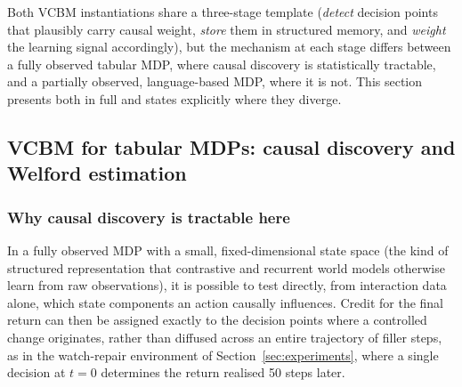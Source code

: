 \documentclass[conference]{IEEEtran}
\begin{document}
Both VCBM instantiations share a three-stage template (\emph{detect} decision points that plausibly carry causal weight, \emph{store} them in structured memory, and \emph{weight} the learning signal accordingly), but the mechanism at each stage differs between a fully observed tabular MDP, where causal discovery is statistically tractable, and a partially observed, language-based MDP, where it is not. This section presents both in full and states explicitly where they diverge.

\subsection{VCBM for tabular MDPs: causal discovery and Welford estimation}
\label{sec:vcbm-tabular}

\subsubsection{Why causal discovery is tractable here}
In a fully observed MDP with a small, fixed-dimensional state space (the kind of structured representation that contrastive \cite{b_kipf2020cswm} and recurrent \cite{b_ha2018worldmodels} world models otherwise learn from raw observations), it is possible to test directly, from interaction data alone, which state components an action causally influences. Credit for the final return can then be assigned exactly to the decision points where a controlled change originates, rather than diffused across an entire trajectory of filler steps, as in the watch-repair environment of Section~\ref{sec:experiments}, where a single decision at $t=0$ determines the return realised 50 steps later.
\end{document}
